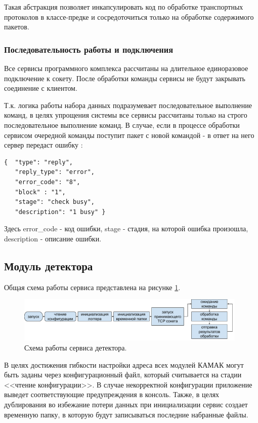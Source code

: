 \documentclass[a4paper,14pt]{extreport}
\begin{document}
Такая абстракция позволяет инкапсулировать код по обработке транспортных протоколов в классе-предке и сосредоточиться только на обработке содержимого пакетов.


\subsubsection{Последовательность работы и подключения}
Все сервисы программного комплекса рассчитаны на длительное единоразовое подключение к сокету. После обработки команды сервисы не будут закрывать соединение с клиентом. 

Т.к. логика работы набора данных подразумевает последовательное выполнение команд, в целях упрощения системы все сервисы рассчитаны только на строго последовательное выполнение команд. В случае, если в процессе обработки сервисом очередной команды поступит пакет с новой командой - в ответ на него сервер передаст ошибку :

\begin{lstlisting}[caption={Пример сообщения об ошибке (сервис занят).}, captionpos=b]
{  "type": "reply",
   "reply_type": "error",
   "error_code": "8",
   "block" : "1",
   "stage": "check busy",
   "description": "1 busy" }
\end{lstlisting}

Здесь error\_code - код ошибки, stage - стадия, на которой ошибка произошла, description - описание ошибки.

\subsection{Модуль детектора}

Общая схема работы сервиса представлена на рисунке \ref{fig:numass-detector-workflow}.

\begin{figure}
  \centering
  \includegraphics[width = 0.98\textwidth]{img/nu_mass_setup/detector_workflow.pdf}
    \caption{Схема работы сервиса детектора.}
    \label{fig:numass-detector-workflow}
\end{figure}

В целях достижения гибкости настройки адреса всех модулей КАМАК могут быть заданы через конфигурационный файл, который считывается на стадии <<чтение конфигурации>>. В случае некорректной конфигурации приложение выведет соответствующие предупреждения в консоль. Также, в целях дублирования во избежание потери данных при инициализации сервис создает временную папку, в которую будут записываться последние набранные файлы.
\end{document}
